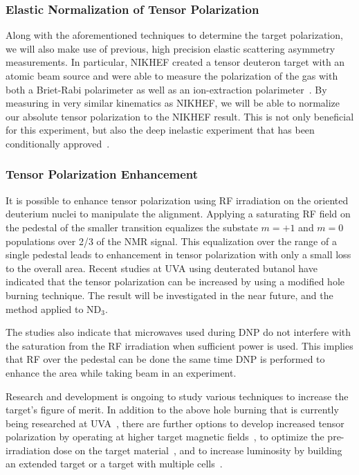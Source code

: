 \subsubsection{Elastic Normalization of Tensor Polarization}

Along with the aforementioned techniques to determine the target polarization, we will also make use of 
previous, high precision elastic scattering asymmetry measurements.  In particular, NIKHEF created a 
tensor deuteron target with an atomic beam source and were able to measure the polarization of the gas 
with both a Briet-Rabi polarimeter as well as an ion-extraction polarimeter~\cite{Zhou:1996gi,Bouwhuis:1998jj}.   
By measuring in very similar kinematics as NIKHEF, we will be able to normalize our absolute tensor polarization
to the NIKHEF result.   This is not only beneficial for this experiment, but also the deep inelastic experiment
that has been conditionally approved~\cite{b1prop}.

\subsubsection{Tensor Polarization Enhancement}
It is possible to enhance tensor polarization using RF irradiation on the oriented deuterium nuclei to manipulate the alignment.
Applying a saturating RF field on the pedestal of the smaller transition equalizes the substate $m=+1$ and $m=0$ populations
over 2/3 of the NMR signal.  This equalization over the range of a single pedestal leads to enhancement in tensor polarization with only a small loss
to the overall area.  Recent studies at UVA using deuterated butanol have indicated that the tensor polarization can be increased by using a modified hole burning technique. The result will be investigated in the near future, and the method applied to ND$_3$.

The studies also indicate that microwaves used during DNP do not
interfere with the saturation from the RF irradiation when sufficient power is used.  This implies that RF over the pedestal can be done the same time DNP is performed to enhance the area while taking beam in an experiment.  

Research and development is ongoing to study various techniques to increase the target's figure of merit. In addition to the above hole burning that is currently being researched at UVA~\cite{keller1, keller2, keller3,Keller:2015tn}, there are further options to develop increased tensor polarization by operating at higher target magnetic fields~\cite{CRABBLAB}, to optimize the pre-irradiation dose on the target material~\cite{Bueltmann:1998wq}, 
and to increase luminosity by building an extended target or a target with multiple cells~\cite{Rondon-Aramayo:2014ida}.

